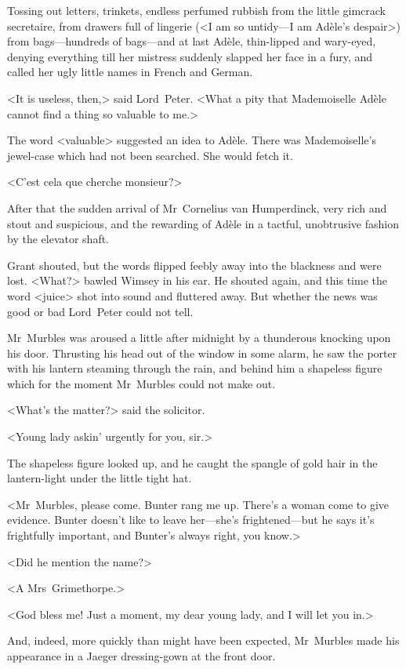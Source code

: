 Tossing out letters, trinkets, endless perfumed rubbish from the little gimcrack secretaire, from drawers full of lingerie (<I am so untidy—I am Adèle's despair>) from bags—hundreds of bags—and at last Adèle, thin-lipped and wary-eyed, denying everything till her mistress suddenly slapped her face in a fury, and called her ugly little names in French and German.

<It is useless, then,> said Lord~Peter. <What a pity that Mademoiselle Adèle cannot find a thing so valuable to me.>

The word <valuable> suggested an idea to Adèle. There was Mademoiselle's jewel-case which had not been searched. She would fetch it.

<C'est cela que cherche monsieur?>

After that the sudden arrival of Mr~Cornelius van Humperdinck, very rich and stout and suspicious, and the rewarding of Adèle in a tactful, unobtrusive fashion by the elevator shaft.

Grant shouted, but the words flipped feebly away into the blackness and were lost. <What?> bawled Wimsey in his ear. He shouted again, and this time the word <juice> shot into sound and fluttered away. But whether the news was good or bad Lord~Peter could not tell.

Mr~Murbles was aroused a little after midnight by a thunderous knocking upon his door. Thrusting his head out of the window in some alarm, he saw the porter with his lantern steaming through the rain, and behind him a shapeless figure which for the moment Mr~Murbles could not make out.

<What's the matter?> said the solicitor.

<Young lady askin' urgently for you, sir.>

The shapeless figure looked up, and he caught the spangle of gold hair in the lantern-light under the little tight hat.

<Mr~Murbles, please come. Bunter rang me up. There's a woman come to give evidence. Bunter doesn't like to leave her—she's frightened—but he says it's frightfully important, and Bunter's always right, you know.>

<Did he mention the name?>

<A Mrs~Grimethorpe.>

<God bless me! Just a moment, my dear young lady, and I will let you in.>

And, indeed, more quickly than might have been expected, Mr~Murbles made his appearance in a Jaeger dressing-gown at the front door.

